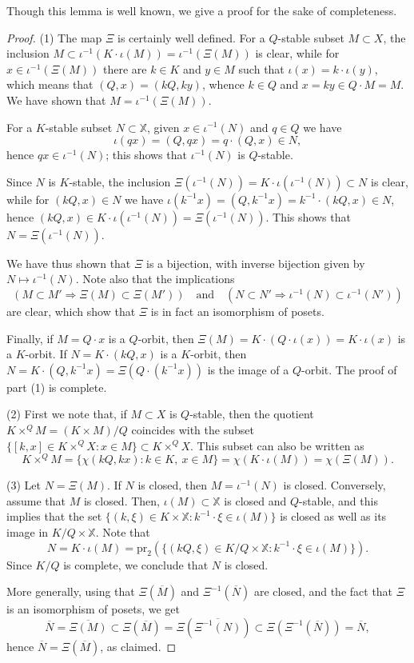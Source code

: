 \documentclass[ALCO,Unicode]{cedram}
\begin{document}
Though this lemma is well known, we give a proof for the sake of completeness.

\begin{proof}
(1) The map $\Xi$ is certainly well defined.
For a $Q$-stable subset $M\subset X$,
the inclusion $M\subset\iota^{-1}(K\cdot\iota(M))=\iota^{-1}(\Xi(M))$ is clear, while for $x\in\iota^{-1}(\Xi(M))$ there are $k\in K$ and $y\in M$ such that $\iota(x)=k\cdot\iota(y)$, which means that $(Q,x)=(kQ,ky)$, whence $k\in Q$ and $x=ky\in Q\cdot M=M$. We have shown that $M=\iota^{-1}(\Xi(M))$.

For a $K$-stable subset $N\subset \mathbb{X}$,
given $x\in \iota^{-1}(N)$ and $q\in Q$ we have
\[\iota(qx)=(Q,qx)=q\cdot (Q,x)\in N,\]
hence $qx\in\iota^{-1}(N)$; this shows that $\iota^{-1}(N)$ is $Q$-stable.

Since $N$ is $K$-stable, the inclusion $\Xi(\iota^{-1}(N))=K\cdot \iota(\iota^{-1}(N))\subset N$ is clear, while for $(kQ,x)\in N$ we have
$\iota(k^{-1}x)=(Q,k^{-1}x)=k^{-1}\cdot(kQ,x)\in N$, hence $(kQ,x)\in K\cdot\iota(\iota^{-1}(N))=\Xi(\iota^{-1}(N))$. This shows that $N=\Xi(\iota^{-1}(N))$.

We have thus shown that $\Xi$ is a bijection, with inverse bijection given by $N\mapsto \iota^{-1}(N)$. Note also that the implications
\[(M\subset M'\Rightarrow \Xi(M)\subset\Xi(M'))\quad\mbox{and}\quad (N\subset N'\Rightarrow \iota^{-1}(N)\subset\iota^{-1}(N'))\]
are clear, which show that $\Xi$ is in fact an isomorphism of posets.

Finally, if $M=Q\cdot x$ is a $Q$-orbit, then $\Xi(M)=K\cdot(Q\cdot\iota(x))=K\cdot \iota(x)$ is a $K$-orbit. If $N=K\cdot(kQ,x)$ is a $K$-orbit, then $N=K\cdot(Q,k^{-1}x)=\Xi(Q\cdot(k^{-1}x))$ is the image of a $Q$-orbit. The proof of part (1) is complete.



(2) First we note that, if $M\subset X$ is $Q$-stable, then the quotient $K\times^QM=(K\times M)/Q$ coincides with the subset $\{[k,x]\in K\times^QX:x\in M\}\subset K\times^QX$. This subset can also be written as
\[K\times^QM=\{\chi(kQ,kx):k\in K,\ x\in M\}=\chi(K\cdot\iota(M))=\chi(\Xi(M)).\]

(3) Let $N=\Xi(M)$. If $N$ is closed, then $M=\iota^{-1}(N)$ is closed.
Conversely, assume that $M$ is closed.
Then, $\iota(M)\subset \mathbb{X}$ is closed and $Q$-stable, and this implies that
the set $\{(k,\xi)\in K\times\mathbb{X}:k^{-1}\cdot \xi\in\iota(M)\}$ is closed as well as its image in $K/Q\times\mathbb{X}$. Note that
\[N=K\cdot \iota(M)=\mathrm{pr}_2(\{(kQ,\xi)\in K/Q\times\mathbb{X}:k^{-1}\cdot \xi\in\iota(M)\}).\]
Since $K/Q$ is complete, we conclude that $N$ is closed.




More generally, using that $\Xi(\overline{M})$ and $\Xi^{-1}(\overline{N})$ are closed, and the fact that $\Xi$ is an isomorphism of posets, we get
\[\overline{N}=\overline{\Xi(M)}\subset\Xi(\overline{M})=\Xi(\overline{\Xi^{-1}(N)})\subset\Xi(\Xi^{-1}(\overline{N}))=\overline{N},\]
hence $\overline{N}=\Xi(\overline{M})$, as claimed.\end{proof}
\end{document}
